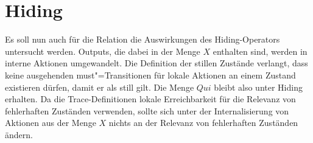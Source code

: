 \section{Hiding}

Es soll nun auch für die Relation \QRel{} die Auswirkungen des Hiding-Operators
untersucht werden. Outputs, die dabei in der Menge $X$ enthalten sind, werden
in interne Aktionen umgewandelt. Die Definition der stillen Zustände verlangt,
dass keine ausgehenden must"=Transitionen für lokale Aktionen an einem Zustand
existieren dürfen, damit er als still gilt. Die Menge $Qui$ bleibt also unter
Hiding erhalten. Da die Trace-Definitionen lokale Erreichbarkeit für die
Relevanz von fehlerhaften Zuständen verwenden, sollte sich unter der
Internalisierung von Aktionen aus der Menge $X$ nichts an der Relevanz von
fehlerhaften Zuständen ändern.

